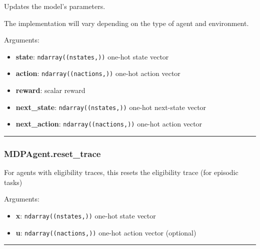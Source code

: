 Updates the model's parameters.

The implementation will vary depending on the type of agent and
environment.

Arguments:

\begin{itemize}
\tightlist
\item
  \textbf{state}: \texttt{ndarray((nstates,))} one-hot state vector
\item
  \textbf{action}: \texttt{ndarray((nactions,))} one-hot action vector
\item
  \textbf{reward}: scalar reward
\item
  \textbf{next\_state}: \texttt{ndarray((nstates,))} one-hot next-state
  vector
\item
  \textbf{next\_action}: \texttt{ndarray((nactions,))} one-hot action
  vector
\end{itemize}

\begin{center}\rule{0.5\linewidth}{\linethickness}\end{center}

\hypertarget{mdpagent.reset_trace}{%
\subsubsection{MDPAgent.reset\_trace}\label{mdpagent.reset_trace}}

\begin{Shaded}
\begin{Highlighting}[]
\OperatorTok{=}\NormalTok{)}
\end{Highlighting}
\end{Shaded}

For agents with eligibility traces, this resets the eligibility trace
(for episodic tasks)

Arguments:

\begin{itemize}
\tightlist
\item
  \textbf{x}: \texttt{ndarray((nstates,))} one-hot state vector
\item
  \textbf{u}: \texttt{ndarray((nactions,))} one-hot action vector
  (optional)
\end{itemize}

\begin{center}\rule{0.5\linewidth}{\linethickness}\end{center}

